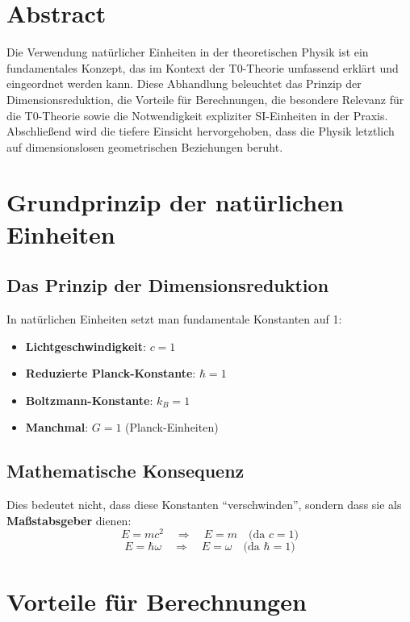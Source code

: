 \section*{Abstract}
		Die Verwendung natürlicher Einheiten in der theoretischen Physik ist ein fundamentales Konzept, das im Kontext der T0-Theorie umfassend erklärt und eingeordnet werden kann. Diese Abhandlung beleuchtet das Prinzip der Dimensionsreduktion, die Vorteile für Berechnungen, die besondere Relevanz für die T0-Theorie sowie die Notwendigkeit expliziter SI-Einheiten in der Praxis. Abschließend wird die tiefere Einsicht hervorgehoben, dass die Physik letztlich auf dimensionslosen geometrischen Beziehungen beruht.

	
	
	\section{Grundprinzip der natürlichen Einheiten}
	\label{sec:grundprinzip}
	
	\subsection{Das Prinzip der Dimensionsreduktion}
	In natürlichen Einheiten setzt man fundamentale Konstanten auf 1:
	\begin{itemize}
		\item \textbf{Lichtgeschwindigkeit}: $c = 1$
		\item \textbf{Reduzierte Planck-Konstante}: $\hbar = 1$
		\item \textbf{Boltzmann-Konstante}: $k_B = 1$
		\item \textbf{Manchmal}: $G = 1$ (Planck-Einheiten)
	\end{itemize}
	
	\subsection{Mathematische Konsequenz}
	Dies bedeutet nicht, dass diese Konstanten ``verschwinden'', sondern dass sie als \textbf{Maßstabsgeber} dienen:
	\begin{equation}
		E = m c^2 \quad \Rightarrow \quad E = m \quad \text{(da $c=1$)}
	\end{equation}
	\begin{equation}
		E = \hbar \omega \quad \Rightarrow \quad E = \omega \quad \text{(da $\hbar=1$)}
	\end{equation}
	
	\section{Vorteile für Berechnungen}
	

